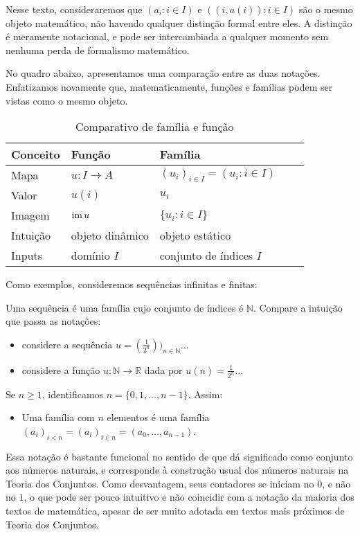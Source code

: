 Nesse texto, consideraremos que $(a_i: i \in I)$ e $((i, a(i)): i \in I)$ são o mesmo objeto matemático, não havendo qualquer distinção formal entre eles.
A distinção é meramente notacional, e pode ser intercambiada a qualquer momento sem nenhuma perda de formalismo matemático.

No quadro abaixo, apresentamos uma comparação entre as duas notações.
Enfatizamos novamente que, matematicamente, funções e famílias podem ser vistas como o mesmo objeto.
\begin{table}[h]
    \centering
    \begin{tabular}{lllll}
        \hline
        \textbf{Conceito} & \textbf{Função} & \textbf{Família} \\ \hline
        Mapa & $u:I\rightarrow A$ & $(u_i)_{i \in I}=(u_i: i \in I)$ \\
        Valor & $u(i)$ & $u_i$ \\
        Imagem & $\operatorname{im} u$ & $\{u_i: i \in I\}$\\
        Intuição & objeto dinâmico & objeto estático \\
        Inputs & domínio $I$ & conjunto de índices $I$ \\
        \hline
    \end{tabular}
    \caption{Comparativo de família e função}
\end{table}

Como exemplos, consideremos sequências infinitas e finitas:

\begin{exemplo}[Sequências]
    Uma sequência é uma família cujo conjunto de índices é $\mathbb N$.
    Compare a intuição que passa as notações:
    \begin{itemize}
    \item considere a sequência $u=(\frac{1}{2^n}))_{n \in \mathbb N}$...
    \item considere a função $u:\mathbb N\rightarrow \mathbb R$ dada por $u(n)=\frac{1}{2^n}$...
    \end{itemize}
\end{exemplo}

\begin{exemplo}
    Se $n\geq 1$, identificamos $n=\{0, 1, \dots, n-1\}$.
    Assim:
    \begin{itemize}
    \item Uma família com $n$ elementos é uma família $(a_i)_{i<n}=(a_i)_{i \in n}=(a_0, \dots, a_{n-1})$.
    \end{itemize}

    Essa notação é bastante funcional no sentido de que dá significado como conjunto aos números naturais, e corresponde à construção usual dos números naturais na Teoria dos Conjuntos.
    Como desvantagem, seus contadores se iniciam no $0$, e não no $1$, o que pode ser pouco intuitivo e não coincidir com a notação da maioria dos textos de matemática, apesar de ser muito adotada em textos mais próximos de Teoria dos Conjuntos.
\end{exemplo}

